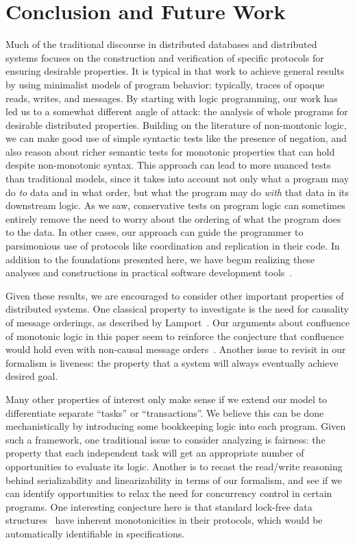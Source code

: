 \section{Conclusion and Future Work}
\label{sec:conclusion}
Much of the traditional discourse in distributed databases and distributed systems focuses on the construction and verification of specific protocols for ensuring desirable properties.  It is typical in that work to achieve general results by using minimalist models of program behavior: typically, traces of opaque reads, writes, and messages.  By starting with logic programming, our work has led us to a somewhat different angle of attack: the analysis of whole programs for desirable distributed properties.  Building on the literature of non-montonic logic, we can make good use of simple syntactic tests like the presence of negation, and also reason about richer semantic tests for monotonic properties that can hold despite non-monotonic syntax.  This approach can lead to more nuanced tests than traditional models, since it takes into account not only what a program may do \emph{to} data and in what order, but what the program may do \emph{with} that data in its downstream logic.  As we saw, conservative tests on program logic can sometimes entirely remove the need to worry about the ordering of what the program does to the data.  In other cases, our approach can guide the programmer to parsimonious use of protocols like coordination and replication in their code.  In addition to the foundations presented here, we have begun realizing these analyses and constructions in practical software development tools~\cite{cidr11}.

Given these results, we are encouraged to consider other important properties of distributed systems.  One classical property to investigate is the need for causality of message orderings, as described by Lamport~\cite{timeclocks}.  Our arguments about confluence of monotonic logic in this paper seem to reinforce the conjecture that confluence would hold even with non-causal message orders~\cite{declarative-imperative}.  Another issue to revisit in our formalism is liveness: the property that a system will always eventually achieve desired goal.  

Many other properties of interest only make sense if we extend our model to differentiate separate ``tasks'' or ``transactions''. We believe this can be done mechanistically by introducing some bookkeeping logic into each \lang program.  Given such a framework, one traditional issue to consider analyzing is fairness: the property that each independent task will get an appropriate number of opportunities to evaluate its logic.  Another is to recast the read/write reasoning behind serializability and linearizability in terms of our formalism, and see if we can identify opportunities to relax the need for concurrency control in certain programs.  One interesting conjecture here is that standard lock-free data structures~\cite{lockfree} have inherent monotonicities in their protocols, which would be automatically identifiable in \lang specifications.
